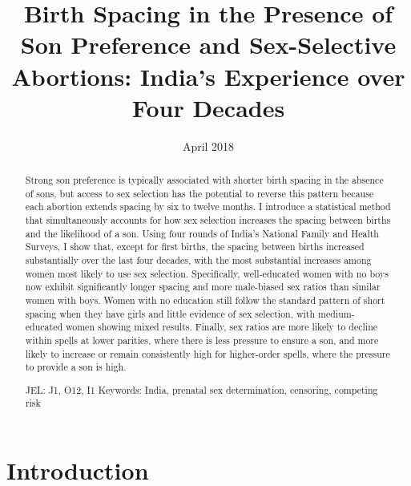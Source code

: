 \documentclass[12pt,letterpaper]{article}
\title{Birth Spacing in the Presence of Son Preference and Sex-Selective Abortions:
India's Experience over Four Decades%
}
\author{}
\date{April 2018}
\begin{document}
\graphicspath{{../figures/}}

\setcounter{page}{-1}
\maketitle
\thispagestyle{empty}



\thispagestyle{empty}
\doublespacing

\begin{abstract}

\noindent 

Strong son preference is typically associated with shorter birth spacing
in the absence of sons, but access to sex selection has the potential to
reverse this pattern because each abortion extends spacing by six to
twelve months. 
I introduce a statistical method that simultaneously
accounts for how sex selection increases the spacing between 
births and the likelihood of a son. 
Using four rounds of India's National
Family and Health Surveys, I show that, except for first births,
the spacing between births increased substantially over the last four
decades, with the most substantial increases among women most 
likely to use sex selection.
Specifically, well-educated women with no boys now
exhibit significantly longer spacing and more male-biased sex ratios
than similar women with boys. 
Women with no education still follow the standard
pattern of short spacing when they have girls and little evidence of sex
selection, with medium-educated women showing mixed results. 
Finally,
sex ratios are more likely to decline within spells at lower parities,
where there is less pressure to ensure a son, and more likely to
increase or remain consistently high for higher-order spells, where the
pressure to provide a son is high.


\noindent JEL: J1, O12, I1
\noindent Keywords: India, prenatal sex determination, censoring, competing risk
\end{abstract}

\newpage



\section{Introduction\label{sec:intro}}
\end{document}
